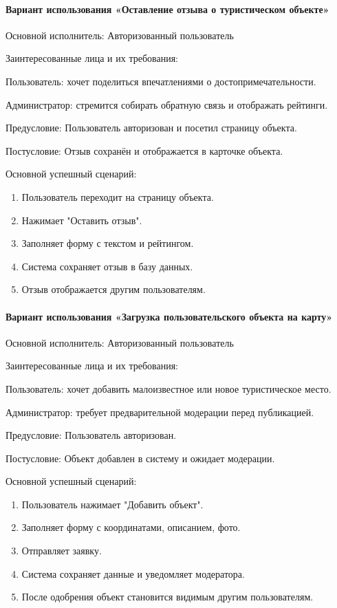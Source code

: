 \paragraph{Вариант использования «Оставление отзыва о туристическом объекте»}

Основной исполнитель: Авторизованный пользователь

Заинтересованные лица и их требования:

Пользователь: хочет поделиться впечатлениями о достопримечательности.

Администратор: стремится собирать обратную связь и отображать рейтинги.

Предусловие: Пользователь авторизован и посетил страницу объекта.

Постусловие: Отзыв сохранён и отображается в карточке объекта.

Основной успешный сценарий:
\begin{enumerate}
	\item Пользователь переходит на страницу объекта.
	\item Нажимает "Оставить отзыв".
	\item Заполняет форму с текстом и рейтингом.
	\item Система сохраняет отзыв в базу данных.
	\item Отзыв отображается другим пользователям.
\end{enumerate}

\paragraph{Вариант использования «Загрузка пользовательского объекта на карту»}

Основной исполнитель: Авторизованный пользователь

Заинтересованные лица и их требования:

Пользователь: хочет добавить малоизвестное или новое туристическое место.

Администратор: требует предварительной модерации перед публикацией.

Предусловие: Пользователь авторизован.

Постусловие: Объект добавлен в систему и ожидает модерации.

Основной успешный сценарий:
\begin{enumerate}
	\item Пользователь нажимает "Добавить объект".
	\item Заполняет форму с координатами, описанием, фото.
	\item Отправляет заявку.
	\item Система сохраняет данные и уведомляет модератора.
	\item После одобрения объект становится видимым другим пользователям.
\end{enumerate}

